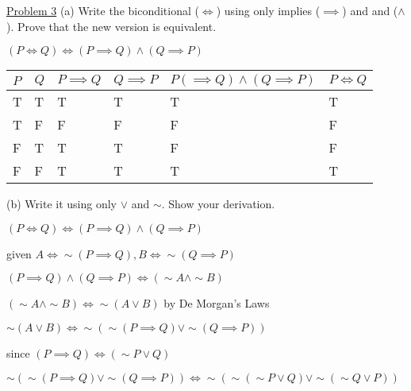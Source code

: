 \documentclass{article}
\begin{document}
\underline{Problem 3}
(a) Write the biconditional ($\Leftrightarrow$) using only implies ($\implies$) and and ($\land$). Prove that the new version is equivalent.
\begin{center}
$(P\Leftrightarrow Q)\iff (P\implies Q)\land (Q\implies P)$

  \begin{tabular}{|l|l|l|l|l|l|}
    \hline $P$&$Q$&$P\implies Q$&$Q\implies P$&$P(\implies Q)\land (Q\implies P)$&$P\Leftrightarrow Q$\\
    \hline T&T&T&T&T&T \\
    \hline T&F&F&F&F&F \\
    \hline F&T&T&T&F&F \\
    \hline F&F&T&T&T&T \\
    \hline
  \end{tabular}
\end{center}
(b) Write it using only $\lor$ and $\sim$. Show your derivation.
\begin{center}
  $(P\Leftrightarrow Q)\iff (P\implies Q)\land (Q\implies P)$

  given  $A\iff \sim (P\implies Q), B\iff \sim (Q\implies P)$

  $(P\implies Q)\land (Q\implies P)\iff (\sim A\land \sim B)$

  $(\sim A\land \sim B) \iff \sim(A\lor B)$ by De Morgan's Laws

  $\sim(A\lor B)\iff \sim(\sim (P\implies Q) \lor \sim (Q\implies P))$
  
  since $(P\implies Q)\iff(\sim P \lor Q)$

  $\sim(\sim (P\implies Q) \lor \sim (Q\implies P)) \iff \sim(\sim (\sim P \lor Q) \lor \sim (\sim Q\lor P))$
\end{center}
\end{document}
